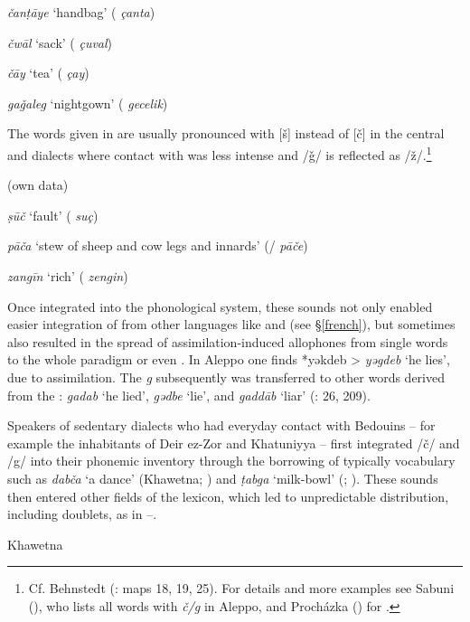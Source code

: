\documentclass[output=paper]{langsci/langscibook}
\begin{document}
\textit{čanṭāye} ‘handbag’ ( \textit{çanta})

\textit{čwāl} ‘sack’ ( \textit{çuval})

\textit{čāy} ‘tea’ ( \textit{çay})

\textit{gaǧaleg} ‘nightgown’ ( \textit{gecelik})
\z

The words given in  are usually pronounced with [š] instead of [č] in the central  and  dialects where contact with  was less intense and /ǧ/ is reflected as /ž/.\footnote{Cf. Behnstedt (\citeyear{Behnstedt1997}: maps 18, 19, 25). For details and more examples see Sabuni (\citeyear[205--210]{Sabuni1980}), who lists all words with \textit{č/g} in Aleppo, and Procházka (\citeyear[185]{Procházka2002Adana}) for  .}

\ea\label{Mosul}
 (own data)

\textit{ṣūč} ‘fault’ ( \textit{suç})

\textit{pāča} ‘stew of sheep and cow legs and innards’ (/ \textit{pāče})

\textit{zangīn} ‘rich’ ( \textit{zengin})
\z

Once integrated into the phonological system, these sounds not only enabled easier integration of  from other languages like  and  (see §\ref{french}), but sometimes also resulted in the spread of assimilation-induced allophones from single words to the whole paradigm or even . In Aleppo one finds *yəkdeb > \textit{yəgdeb} ‘he lies’, due to assimilation. The \textit{g} subsequently was transferred to other words derived from the : \textit{gadab} ‘he lied’, \textit{gədbe} ‘lie’, and \textit{gaddāb} ‘liar’ (\citealt{Sabuni1980}: 26, 209). 

Speakers of sedentary dialects who had everyday contact with Bedouins – for example the inhabitants of Deir ez-Zor and Khatuniyya – first integrated /č/ and /g/ into their phonemic inventory through the borrowing of typically  vocabulary such as \textit{dabča} ‘a  dance’ (Khawetna; \citealt[29]{Talay1999}) and \textit{ṭabga} ‘milk-bowl’ (; \citealt[310]{Behnstedt1994Soukhne}). These sounds then entered other fields of the lexicon, which led to unpredictable distribution, including doublets, as in --.

\ea\label{Khawetna} Khawetna \citep[28--31]{Talay1999}  
\end{document}
